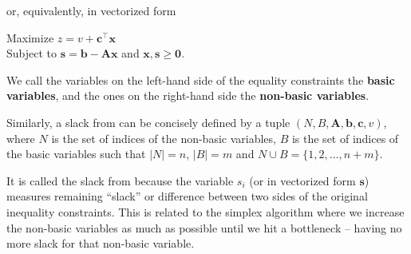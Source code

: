 or, equivalently, in vectorized form

Maximize $z = v + \mathbf{c}^\top \mathbf{x}$ \\
Subject to $\mathbf{s} = \mathbf{b} - \mathbf{A}\mathbf{x}$ and $\mathbf{x},\mathbf{s} \geq \boldsymbol{0}$.

We call the variables on the left-hand side of the equality constraints the \textbf{basic variables}, and the ones on the right-hand side the \textbf{non-basic variables}.

Similarly, a slack from can be concisely defined by a tuple $(N,B,\mathbf{A},\mathbf{b},\mathbf{c},v)$, where $N$ is the set of indices of the non-basic variables, $B$ is the set of indices of the basic variables such that $|N| = n$, $|B|=m$ and $N \cup B = \{1,2,\ldots,n+m\}$.

It is called the slack from because the variable $s_i$ (or in vectorized form $\mathbf{s}$) measures remaining ``slack'' or difference between two sides of the original inequality constraints. This is related to the simplex algorithm where we increase the non-basic variables as much as possible until we hit a bottleneck -- having no more slack for that non-basic variable.
